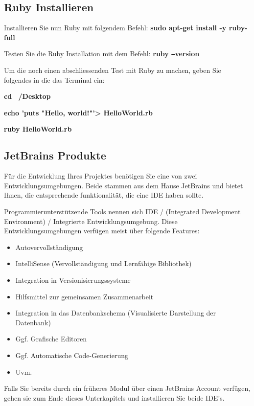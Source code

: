 \subsection{Ruby Installieren}\label{subsec:rubyinstallieren}
\begin{frame}[fragile]
    Installieren Sie nun Ruby mit folgendem Befehl: \textbf{sudo apt-get install -y ruby-full}

    Testen Sie die Ruby Installation mit dem Befehl: \textbf{ruby \texttt{--}version}

    Um die noch einen abschliessenden Test mit Ruby zu machen, geben Sie folgendes in die das Terminal ein:
    \vSpaceStyle{0.1em}

    \textbf{cd ~/Desktop}
    \vSpaceStyle{0.1em}

    \textbf{echo 'puts "Hello, world!"\space\textquoteright > HelloWorld.rb}
    \vSpaceStyle{0.1em}

    \textbf{ruby HelloWorld.rb}
\end{frame}

\subsection{JetBrains Produkte}\label{subsec:jetbrains}
\begin{frame}[fragile]
    Für die Entwicklung Ihres Projektes benötigen Sie eine von zwei Entwicklungsumgebungen.
    Beide stammen aus dem Hause JetBrains und bietet Ihnen, die entsprechende funktionalität, die eine IDE haben sollte.

    Programmierunterstützende Tools nennen sich IDE / (Integrated Development Environment) /
    Integrierte Entwicklungsumgebung.
    Diese Entwicklungsumgebungen verfügen meist über folgende Features:
    \begin{itemize}
        \item Autovervollständigung
        \item IntelliSense (Vervollständigung und Lernfähige Bibliothek)
        \item Integration in Versionisierungssysteme
        \item Hilfsmittel zur gemeinsamen Zusammenarbeit
        \item Integration in das Datenbankschema (Visualisierte Darstellung der Datenbank)
        \item Ggf. Grafische Editoren
        \item Ggf. Automatische Code-Generierung
        \item Uvm.
    \end{itemize}

    Falls Sie bereits durch ein früheres Modul über einen JetBrains Account verfügen, gehen sie zum Ende dieses
    Unterkapitels und installieren Sie beide IDE's.
\end{frame}

